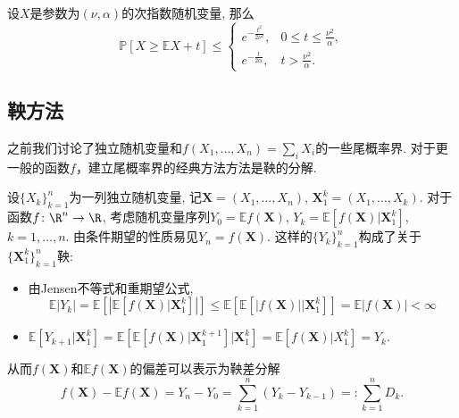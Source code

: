 \begin{theorem}[次指数随机变量的上偏差不等式]\label{thm:UpperDeviationOfSubExpRV}
	设$X$是参数为$(\nu, \alpha)$的次指数随机变量, 那么
	\begin{equation*}
		\mathbb{P}[X \geq \mathbb{E}X + t] \leq 
		\begin{cases}
			e^{-\frac{t^2}{2 \nu^2}}, & 0 \leq t \leq \frac{\nu^2}{\alpha}, \\
			e^{-\frac{t}{2 \alpha}}, & t > \frac{\nu^2}{\alpha}.
		\end{cases}
	\end{equation*}
\end{theorem}



\subsection{鞅方法}

之前我们讨论了独立随机变量和$f(X_1, \dots, X_n) = \sum_i X_i$的一些尾概率界. 对于更一般的函数$f$，建立尾概率界的经典方法方法是鞅的分解. 

设$\{X_k\}_{k=1}^n$为一列独立随机变量, 记$\bm X = (X_1, \dots, X_n)$, $\bm X_1^k = (X_1, \dots, X_k)$. 
对于函数$f \colon \R^n \to \R$, 考虑随机变量序列$Y_0 = \mathbb{E}f(\bm X)$, $Y_k = \mathbb{E}[f(\bm X)|\bm X_1^k]$, $k = 1, \dots, n$. 
由条件期望的性质易见$Y_n = f(\bm X)$. 
这样的$\{Y_k\}_{k=1}^n$构成了关于$\{\bm X_1^k\}_{k=1}^n$鞅: 
\begin{itemize}
	\item 由Jensen不等式和重期望公式, 
		\begin{equation*}
			\mathbb{E}|Y_k| 
			= \mathbb{E}\left[\left|\mathbb{E}[f(\bm X)|\bm X_1^k]\right|\right] 
			\leq \mathbb{E}\left[\mathbb{E}[|f(\bm X)||\bm X_1^k] \right]
			= \mathbb{E}|f(\bm X)|
			< \infty
		\end{equation*}
	\item $\mathbb{E}[Y_{k+1}|\bm X_1^k] = \mathbb{E}\left[\mathbb{E}[f(\bm X)|\bm X_1^{k+1}] \big|\bm X_1^k\right] = \mathbb{E}[f(\bm X) | X_1^k] = Y_k$. 
\end{itemize}
从而$f(\bm X)$和$\mathbb{E}f(\bm X)$的偏差可以表示为鞅差分解
\begin{equation*}
	f(\bm X) - \mathbb{E}f(\bm X) 
	= Y_n - Y_0 
	= \sum_{k=1}^n (Y_k - Y_{k-1})
	=: \sum_{k=1}^n D_k.
\end{equation*}

